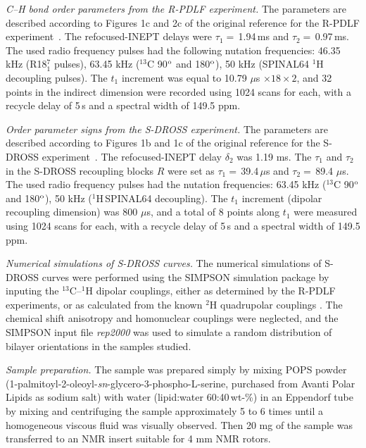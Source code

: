\documentclass[aps,prl,superscriptaddress,twocolumn]{revtex4}
\begin{document}
{\emph{C--H bond order parameters from the R-PDLF experiment.}} The parameters are described according to Figures 1c and 2c of the original reference
for the R-PDLF experiment~\cite{dvinskikh04}.  The refocused-INEPT delays were $\tau_1=$\,1.94\,ms and $\tau_2=$\,0.97\,ms.
The used radio frequency pulses had the following nutation frequencies: 46.35 kHz (R18$^7_1$ pulses), 63.45 kHz ($^{13}$C 90$^{\rm{o}}$ and 180$^{\rm{o}}$),
50 kHz (SPINAL64 $^1$H decoupling pulses).
The $t_1$ increment was equal to 10.79 $\mu$s $\times18\times2$, and 32 points in the indirect
dimension were recorded using 1024 scans for each, with a recycle delay of 5\,s and a spectral width of 149.5 ppm.

\emph{Order parameter signs from the S-DROSS experiment.}
The parameters are described according to Figures 1b and 1c of the original reference for the S-DROSS
experiment~\cite{gross97}. The refocused-INEPT delay $\delta_2$ was 1.19 ms. The $\tau_1$ and $\tau_2$ in the S-DROSS recoupling
blocks $R$ were set as $\tau_1=$\,39.4\,$\mu$s and $\tau_2=$\,89.4 $\mu$s. The used radio frequency pulses had the nutation
frequencies: 63.45 kHz ($^{13}$C 90$^{\rm{o}}$ and 180$^{\rm{o}}$), 50 kHz ($^1$H\,SPINAL64 decoupling).
The $t_1$ increment (dipolar recoupling dimension) was 800 $\mu$s, and a total of 8 points along $t_1$ were
measured using 1024 scans for each, with a recycle delay of 5\,s and a spectral width of 149.5 ppm.

\emph{Numerical simulations of S-DROSS curves.}
The numerical simulations of S-DROSS curves were performed using the SIMPSON simulation package \cite{bak00}
by inputing the $^{13}$C--$^1$H
dipolar couplings, either as determined by the R-PDLF experiments, or as calculated from the known $^2$H quadrupolar couplings \cite{browning80}.
The chemical shift anisotropy and homonuclear couplings were neglected, and the SIMPSON input file {\it{rep2000}} was used to simulate a random
distribution of bilayer orientations in the samples studied.

\emph{Sample preparation.}
The sample was prepared simply by mixing POPS powder (1-palmitoyl-2-oleoyl-{\it sn}-glycero-3-phospho-L-serine, purchased from Avanti Polar Lipids
as sodium salt) with water (lipid:water 60:40\,wt-\%) in an Eppendorf tube by mixing and centrifuging the sample approximately 5 to 6 times
until a homogeneous viscous fluid was visually observed. Then 20 mg of the sample was transferred to an NMR insert suitable for 4 mm NMR rotors.  
\end{document}
